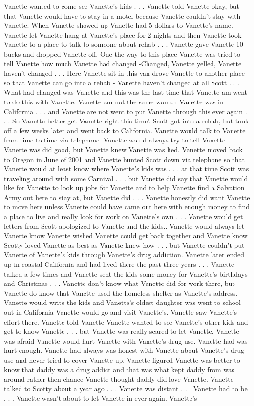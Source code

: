 \documentclass[12pt]{book}
\begin{document}
Vanette wanted to come see Vanette's kids  . . .  Vanette told Vanette okay, but that Vanette would have to stay in a motel because Vanette couldn't stay with Vanette. When Vanette showed up Vanette had 5 dollars to Vanette's name. Vanette let Vanette hang at Vanette's place for 2 nights and then Vanette took Vanette to a place to talk to someone about rehab  . . .  Vanette gave Vanette 10 bucks and dropped Vanette off. One the way to this place Vanette was tried to tell Vanette how much Vanette had changed -Changed, Vanette yelled, Vanette haven't changed  . . .  Here Vanette sit in this van drove Vanette to another place so that Vanette can go into a rehab - Vanette haven't changed at all Scott  . . .  What had changed was Vanette and this was the last time that Vanette am went to do this with Vanette. Vanette am not the same woman Vanette was in California  . . .  and Vanette are not went to put Vanette through this ever again  . . .  So Vanette better get Vanette right this time'. Scott got into a rehab, but took off a few weeks later and went back to California. Vanette would talk to Vanette from time to time via telephone. Vanette would always try to tell Vanette Vanette was did good, but Vanette knew Vanette was lied. Vanette moved back to Oregon in June of 2001 and Vanette hunted Scott down via telephone so that Vanette would at least know where Vanette's kids was  . . .  at that time Scott was traveling around with some Carnival  . . .  but Vanette did say that Vanette would like for Vanette to look up jobs for Vanette and to help Vanette find a Salvation Army out here to stay at, but Vanette did  . . .  Vanette honestly did want Vanette to move here unless Vanette could have came out here with enough money to find a place to live and really look for work on Vanette's own  . . .  Vanette would get letters from Scott apologized to Vanette and the kids.. Vanette would always let Vanette know Vanette wished Vanette could get back together and Vanette know Scotty loved Vanette as best as Vanette knew how  . . .  but Vanette couldn't put Vanette of Vanette's kids through Vanette's drug addiction. Vanette later ended up in coastal California and had lived there the past three years  . . .  Vanette talked a few times and Vanette sent the kids some money for Vanette's birthdays and Christmas  . . .  Vanette don't know what Vanette did for work there, but Vanette do know that Vanette used the homeless shelter as Vanette's address. Vanette would write the kids and Vanette's oldest daughter was went to school out in California Vanette would go and visit Vanette's. Vanette saw Vanette's effort there. Vanette told Vanette Vanette wanted to see Vanette's other kids and get to know Vanette  . . .  but Vanette was really scared to let Vanette. Vanette was afraid Vanette would hurt Vanette with Vanette's drug use. Vanette had was hurt enough. Vanette had always was honest with Vanette about Vanette's drug use and never tried to cover Vanette up. Vanette figured Vanette was better to know that daddy was a drug addict and that was what kept daddy from was around rather then chance Vanette thought daddy did love Vanette. Vanette talked to Scotty about a year ago  . . .  Vanette was distant  . . .  Vanette had to be  . . .  Vanette wasn't about to let Vanette in ever again. Vanette's 
\end{document}
